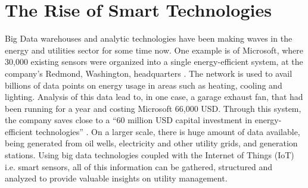 \section{The Rise of Smart Technologies}
Big Data warehouses and analytic technologies have been making waves in the energy and utilities sector for some time now. One example is of Microsoft, where 30,000 existing sensors were organized into a single energy-efficient system, at the company's Redmond, Washington, headquarters \cite{wharton04}. The network is used to avail billions of data points on energy usage in areas such as heating, cooling and lighting. Analysis of this data lead to, in one case, a garage exhaust fan, that had been running for a year and costing Microsoft 66,000 USD. Through this system, the company saves close to a ``60 million USD capital investment in energy-efficient technologies'' \cite{wharton04}. On a larger scale, there is huge amount of data available, being generated from oil wells, electricity and other utility grids, and generation stations. Using big data technologies coupled with the Internet of Things (IoT) i.e. smart sensors, all of this information can be gathered, structured and analyzed to provide valuable insights on utility management.

